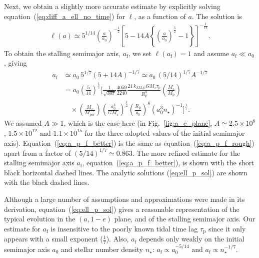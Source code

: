 \documentclass[iop,usenatbib]{emulateapj}
\newcommand{\mper}{M_\mathrm{per}}
\begin{document}
Next, we obtain a slightly more accurate estimate by explicitly solving equation~(\ref{eq:diff_a_ell_no_time}) for $\ell$, as a function of $a$. The solution is
\begin{align}
\label{eq:ell_p_sol}
\ell(a) \simeq 5^{1/14} \left ( \frac{a}{a_{0}} \right )^{-\frac{1}{2}} \left [ 5 - 14 A \left \{ \left ( \frac{a}{a_{0}} \right )^{\frac{5}{2}} - 1 \right \} \right ]^{-\frac{1}{14}}.
\end{align}
To obtain the stalling semimajor axis, $a_{\mathrm{f}}$, we set $\ell(a_{\mathrm{f}}) = 1$ and assume $a_{\mathrm{f}} \ll a_{0}$, giving
\begin{align}
\label{eq:a_p_f_better}
\nonumber a_{\mathrm{f}} &\simeq a_{0} \, 5^{1/7} \left ( 5 + 14 A \right )^{-1/7} \simeq a_{0} \, (5/14)^{1/7} A^{-1/7} \\
\nonumber &= a_{0} \left ( \frac{5}{14} \right )^{\frac{1}{7}} \biggl [ \frac{1}{\sqrt{30\pi}} \frac{4059}{2240} \frac{21 \, k_\mathrm{AM,p} G M_\star \tau_\mathrm{p}}{R_\mathrm{p}^3} \left ( \frac{M_\star}{M_\mathrm{p}} \right ) \\
&\quad  \times \left ( \frac{M_\star}{\mper} \right ) \left ( \frac{a_{0}^3}{G M_\star} \right )^{\frac{1}{2}} \left ( \frac{R_\mathrm{p}}{a_{0}} \right )^8 \left ( a_{0}^{3} n_\star \right )^{-1} \biggl ]^{\frac{1}{7}}.
\end{align}
We assumed $A\gg 1$, which is the case here (in Fig.~\ref{fig:a_e_plane}, $A \simeq 2.5 \times 10^8$, $1.5\times 10^{12}$ and $1.1\times 10^{15}$ for the three adopted values of the initial semimajor axis). Equation~(\ref{eq:a_p_f_better}) is the same as equation~(\ref{eq:a_p_f_rough}) apart from a factor of $(5/14)^{1/7} \simeq 0.863$. The more refined estimate for the stalling semimajor axis $a_\mathrm{f}$, equation~(\ref{eq:a_p_f_better}), is shown with the short black horizontal dashed lines. The analytic solutions (\ref{eq:ell_p_sol}) are shown with the black dashed lines. 

Although a large number of assumptions and approximations were made in its derivation, equation~(\ref{eq:ell_p_sol}) gives a reasonable representation of the typical evolution in the $(a,1-e)$ plane, and of the stalling semimajor axis.  Our estimate for $a_\mathrm{f}$ is insensitive to the poorly known tidal time lag $\tau_\mathrm{p}$ since it only appears with a small exponent ($\frac{1}{7}$). Also, $a_\mathrm{f}$ depends only weakly on the initial semimajor axis $a_0$ and stellar number density $n_\star$: $a_\mathrm{f}\propto a_0^{-5/14}$ and $a_\mathrm{f} \propto n_\star^{-1/7}$. 
\end{document}
